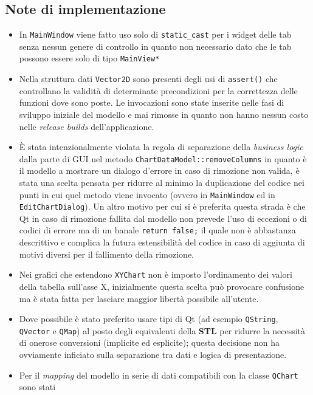 \subsection{Note di implementazione}
\begin{itemize}
    \item In \texttt{MainWindow} viene fatto uso solo di \texttt{static\_cast} per i widget delle tab senza nessun
          genere di controllo in quanto non necessario dato che le tab possono essere solo di tipo \texttt{MainView*}
    \item Nella struttura dati \texttt{Vector2D} sono presenti degli usi di \texttt{assert()} che controllano la
          validità di determinate precondizioni per la correttezza delle funzioni dove sono poste.
          Le invocazioni sono state inserite nelle fasi di sviluppo iniziale del modello e mai rimosse in quanto non
          hanno nessun costo nelle \textit{release builds} dell'applicazione.
    \item È stata intenzionalmente violata la regola di separazione della \textit{business logic} dalla parte di GUI nel
          metodo \texttt{ChartDataModel::removeColumns} in quanto è il modello a mostrare un dialogo d'errore in caso
          di rimozione non valida, è stata una scelta pensata per ridurre al minimo la duplicazione del codice nei
          punti in cui quel metodo viene invocato (ovvero in \texttt{MainWindow} ed in \texttt{EditChartDialog}).
          Un altro motivo per cui si è preferita questa strada è che Qt in caso di rimozione fallita dal modello non
          prevede l'uso di eccezioni o di codici di errore ma di un banale \texttt{return false;} il quale non è
          abbastanza descrittivo e complica la futura estensibilità del codice in caso di aggiunta di motivi diversi per
          il fallimento della rimozione.
    \item Nei grafici che estendono \texttt{XYChart} non è imposto l'ordinamento dei valori della tabella sull'asse
          X, inizialmente questa scelta può provocare confusione ma è stata fatta per lasciare maggior libertà possibile
          all'utente.
    \item Dove possibile è stato preferito usare tipi di Qt (ad esempio \texttt{QString}, \texttt{QVector} e
          \texttt{QMap}) al posto degli equivalenti della \textbf{STL} per ridurre la necessità di onerose conversioni
          (implicite ed esplicite); questa decisione non ha ovviamente inficiato sulla separazione tra dati e logica
          di presentazione.
    \item Per il \textit{mapping} del modello in serie di dati compatibili con la classe \texttt{QChart} sono stati

\end{itemize}

